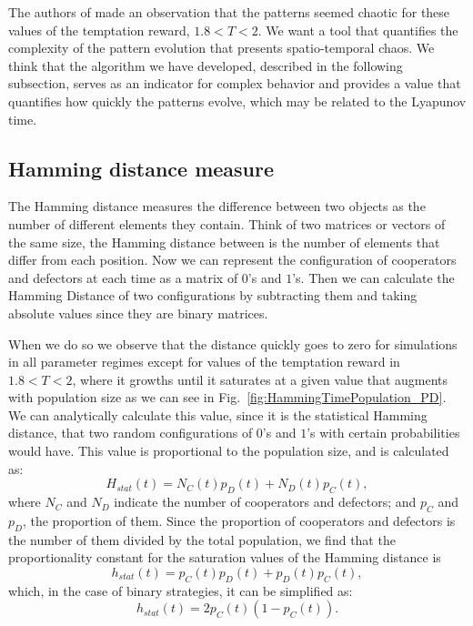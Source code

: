 The authors of \cite{SpatialChaos} made an observation that the patterns seemed chaotic for these values of the temptation reward, $1.8 < T < 2$. We want a tool that quantifies the complexity of the pattern evolution that presents spatio-temporal chaos. We think that the algorithm we have developed, described in the following subsection, serves as an indicator for complex behavior and provides a value that quantifies how quickly the patterns evolve, which may be related to the Lyapunov time.



\subsection{Hamming distance measure}


The Hamming distance measures the difference between two objects as the number of different elements they contain. Think of two matrices or vectors of the same size, the Hamming distance between is the number of elements that differ from each position. Now we can represent the configuration of cooperators and defectors at each time as a matrix of $0$'s and $1$'s. Then we can calculate the Hamming Distance of two configurations by subtracting them and taking absolute values since they are binary matrices.

When we do so we observe that the distance quickly goes to zero for simulations in all parameter regimes except for values of the temptation reward in $1.8 < T < 2$, where it growths until it saturates at a given value that augments with population size as we can see in Fig.~\ref{fig:HammingTimePopulation_PD}. We can analytically calculate this value, since it is the statistical Hamming distance, that two random configurations of $0$'s and $1$'s with certain probabilities would have. This value is proportional to the population size, and is calculated as:
\begin{equation}
H_{stat}(t)=N_C(t)p_D(t)+N_D(t)p_C(t),
\end{equation} 
where $N_C$ and $N_D$ indicate the number of cooperators and defectors; and $p_C$ and $p_D$, the proportion of them. Since the proportion of cooperators and defectors is the number of them divided by the total population, we find that the 
proportionality constant for the saturation values of the Hamming distance is
\begin{equation}
h_{stat}(t)=p_C(t)p_D(t)+p_D(t)p_C(t),
\end{equation} 
which, in the case of binary strategies, it can be simplified as:
\begin{equation}
h_{stat}(t)=2p_C(t)(1-p_C(t)).
\end{equation} 

